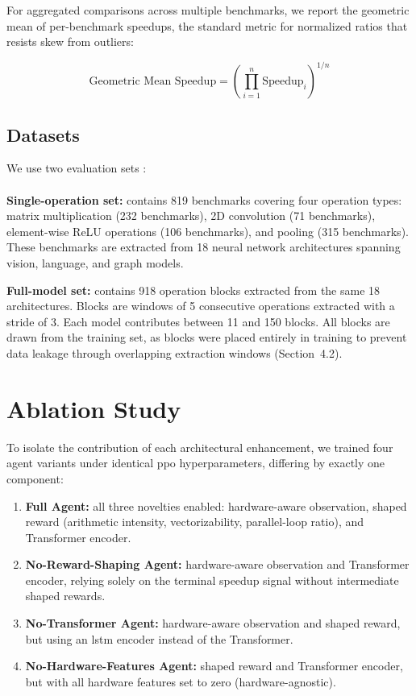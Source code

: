 For aggregated comparisons across multiple benchmarks, we report the geometric mean of per-benchmark speedups, the standard metric for normalized ratios that resists skew from outliers:

\begin{equation}
    \text{Geometric Mean Speedup} = \left( \prod_{i=1}^{n} \text{Speedup}_i \right)^{1/n}
\end{equation}

\newpage
\subsection{Datasets}

We use two evaluation sets : \\ \\
\textbf{Single-operation set:} contains 819 benchmarks covering four operation types: matrix multiplication (232 benchmarks), 2D convolution (71 benchmarks), element-wise ReLU operations (106 benchmarks), and pooling (315 benchmarks). These benchmarks are extracted from 18 neural network architectures spanning vision, language, and graph models.

\textbf{Full-model set:} contains 918 operation blocks extracted from the same 18 architectures. Blocks are windows of 5 consecutive operations extracted with a stride of 3. Each model contributes between 11 and 150 blocks. All blocks are drawn from the training set, as blocks were placed entirely in training to prevent data leakage through overlapping extraction windows (Section~4.2).

\section{Ablation Study}
\label{sec:ablation-multi-hw}

To isolate the contribution of each architectural enhancement, we trained four agent variants under identical \gls{ppo} hyperparameters, differing by exactly one component:

\begin{enumerate}
    \item \textbf{Full Agent:} all three novelties enabled: hardware-aware observation, shaped reward (arithmetic intensity, vectorizability, parallel-loop ratio), and Transformer encoder.
    \item \textbf{No-Reward-Shaping Agent:} hardware-aware observation and Transformer encoder, relying solely on the terminal speedup signal without intermediate shaped rewards.
    \item \textbf{No-Transformer Agent:} hardware-aware observation and shaped reward, but using an \gls{lstm} encoder instead of the Transformer.
    \item \textbf{No-Hardware-Features Agent:} shaped reward and Transformer encoder, but with all hardware features set to zero (hardware-agnostic).
\end{enumerate}

